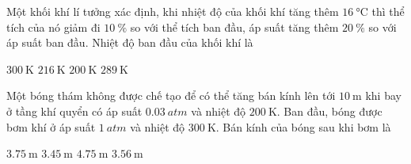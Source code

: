 \begin{ex}
	Một khối khí lí tưởng xác định, khi nhiệt độ của khối khí tăng thêm $\SI{16}{\celsius}$ thì thể tích của nó giảm đi $\SI{10}{\percent}$ so với thể tích ban đầu, áp suất tăng thêm $\SI{20}{\percent}$ so với áp suất ban đầu. Nhiệt độ ban đầu của khối khí là
	
	\choice
	{$\SI{300}{\kelvin}$}
	{$\SI{216}{\kelvin}$}
	{\True $\SI{200}{\kelvin}$}
	{$\SI{289}{\kelvin}$}
\end{ex}
\begin{ex}
	Một bóng thám không được chế tạo để có thể tăng bán kính lên tới $\SI{10}{\meter}$ khi bay ở tầng khí quyển có áp suất $\SI{0.03}{atm}$ và nhiệt độ $\SI{200}{\kelvin}$. Ban đầu, bóng được bơm khí ở áp suất $\SI{1}{atm}$ và nhiệt độ $\SI{300}{\kelvin}$. Bán kính của bóng sau khi bơm là
	
	\choice
	{$\SI{3.75}{\meter}$}
	{$\SI{3.45}{\meter}$}
	{$\SI{4.75}{\meter}$}
	{\True $\SI{3.56}{\meter}$}
\end{ex}
